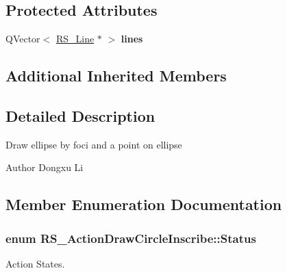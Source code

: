 \subsection*{Protected Attributes}
\begin{DoxyCompactItemize}
\item 
\hypertarget{classRS__ActionDrawCircleInscribe_afafc7c54d7bafd5aa2ecf37dfe2f7b5d}{Q\-Vector$<$ \hyperlink{classRS__Line}{R\-S\-\_\-\-Line} $\ast$ $>$ {\bfseries lines}}\label{classRS__ActionDrawCircleInscribe_afafc7c54d7bafd5aa2ecf37dfe2f7b5d}

\end{DoxyCompactItemize}
\subsection*{Additional Inherited Members}


\subsection{Detailed Description}
Draw ellipse by foci and a point on ellipse

\begin{DoxyAuthor}{Author}
Dongxu Li 
\end{DoxyAuthor}


\subsection{Member Enumeration Documentation}
\hypertarget{classRS__ActionDrawCircleInscribe_a8fc9869ac02de3e075f94e0a39b8eacc}{
\subsubsection[{Status}]{\setlength{\rightskip}{0pt plus 5cm}enum {\bf R\-S\-\_\-\-Action\-Draw\-Circle\-Inscribe\-::\-Status}}}\label{classRS__ActionDrawCircleInscribe_a8fc9869ac02de3e075f94e0a39b8eacc}
Action States. 

